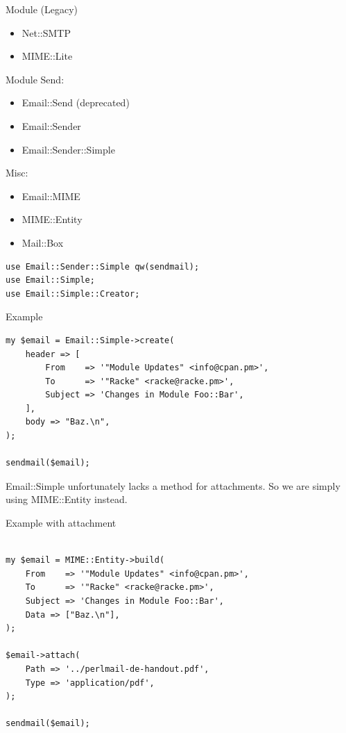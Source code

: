 \begin{frame}{Module (Legacy)}
  \begin{itemize}
    \item Net::SMTP
    \item MIME::Lite
  \end{itemize}
\end{frame}

\begin{frame}{Module}
  Send:

  \begin{itemize}
  \item Email::Send (deprecated)
  \item Email::Sender
  \item Email::Sender::Simple
  \end{itemize}

  Misc:

  \begin{itemize}
  \item Email::MIME
  \item MIME::Entity
  \item Mail::Box
  \end{itemize}

\end{frame}

\begin{lstlisting}
use Email::Sender::Simple qw(sendmail);
use Email::Simple;
use Email::Simple::Creator;
\end{lstlisting}

\begin{frame}[fragile]{Example}
  \begin{verbatim}
my $email = Email::Simple->create(
    header => [
        From    => '"Module Updates" <info@cpan.pm>',
        To      => '"Racke" <racke@racke.pm>',
        Subject => 'Changes in Module Foo::Bar',
    ],
    body => "Baz.\n",
);

sendmail($email);
  \end{verbatim}
\end{frame}

Email::Simple unfortunately lacks a method for attachments. So we are simply
using MIME::Entity instead.

\begin{frame}[fragile]{Example with attachment}
\begin{verbatim}

my $email = MIME::Entity->build(
    From    => '"Module Updates" <info@cpan.pm>',
    To      => '"Racke" <racke@racke.pm>',
    Subject => 'Changes in Module Foo::Bar',
    Data => ["Baz.\n"],
);

$email->attach(
    Path => '../perlmail-de-handout.pdf',
    Type => 'application/pdf',
);

sendmail($email);
  \end{verbatim}
\end{frame}

